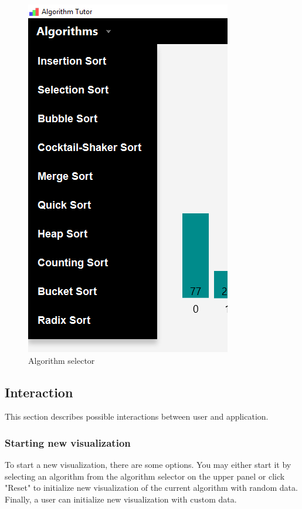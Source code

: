 \documentclass[
  field=inf,
  biblatex,
  language=english,
  glossaries,
  theorems=false,
  sourcecodes=false,
  index
]{kidiplom}
\begin{document}
\begin{figure}[H]
\begin{center}
	\includegraphics[scale=0.3]{img/ui/Selector.png}
	\caption{Algorithm selector}\label{fig:selector}
\end{center}
\end{figure}

\subsection{Interaction}

This section describes possible interactions between user and application.

\subsubsection{Starting new visualization}
To start a new visualization, there are some options. You may either start it by selecting an algorithm from the algorithm selector on the upper panel or click "Reset" to initialize new visualization of the current algorithm with random data. Finally, a user can initialize new visualization with custom data.
\end{document}
